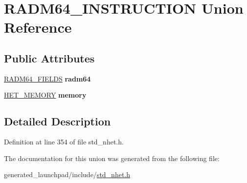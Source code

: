 \hypertarget{unionRADM64__INSTRUCTION}{}\section{R\+A\+D\+M64\+\_\+\+I\+N\+S\+T\+R\+U\+C\+T\+I\+ON Union Reference}
\label{unionRADM64__INSTRUCTION}
\subsection*{Public Attributes}
\begin{DoxyCompactItemize}
\item 
\mbox{\label{unionRADM64__INSTRUCTION_a638272421a08bd325643bc0d2bee015d}} 
\mbox{\hyperlink{structRADM64__format}{R\+A\+D\+M64\+\_\+\+F\+I\+E\+L\+DS}} {\bfseries radm64}
\item 
\mbox{\label{unionRADM64__INSTRUCTION_aac238d348b102300e8ea95b94adb5c41}} 
\mbox{\hyperlink{structmemory__format}{H\+E\+T\+\_\+\+M\+E\+M\+O\+RY}} {\bfseries memory}
\end{DoxyCompactItemize}


\subsection{Detailed Description}


Definition at line 354 of file std\+\_\+nhet.\+h.



The documentation for this union was generated from the following file\+:\begin{DoxyCompactItemize}
\item 
generated\+\_\+launchpad/include/\mbox{\hyperlink{std__nhet_8h}{std\+\_\+nhet.\+h}}\end{DoxyCompactItemize}
